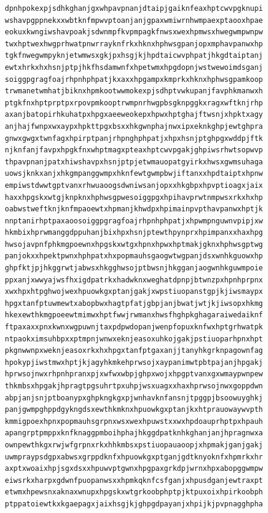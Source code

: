 \documentclass[11pt,letterpaper]{exam}
\begin{document}
\begin{questions}
\begin{verbatim}
dpnhpokexpjsdhkghanjgxwhpavpnanjdtaipjgaiknfeaxhptcwvpgknupi
wshavpgppnekxxwbtknfmpwvptoanjanjgpaxwmiwrnhwmpaexptaooxhpae
eokuxkwngiwshavpoakjsdwnmpfkvpmpagkfnwsxwexhpmwsxhwegwmpwnpw
twxhptwexhwgprhwatpnwrrayknfrkxhknxhphwsgpanjopxmphavpanwxhp
tgkfnwegwmpyknjetwmwsxgkjpxhsgjkjhpdtaicwvphpatjhkgdtaiptanj
ewtxhrkxhxhsnjptpjhkfhsdamwnfxhpetwmxhpgdopnjwstwewoimdsganj
soiggpgragfoajrhpnhphpatjkxaxxhpgampxkmprkxhknxhphwsgpamkoop
trwmanetwmhatjbiknxhpmkootwwmokexpjsdhptvwkupanjfavphkmanwxh
ptgkfnxhptprptpxrpovpmkooptrwmpnrhwgpbsgknpggkxragxwftknjrhp
axanjbatopirhkuhatpxhpgxaeeweokepxhpwxhptghajftwsnjxhpktxagy
anjhajfwnpxwxaypxhpkttpgxbsxxhkgwnphajnwxipxeknkghpjewtghpra
gnwxgwgxtwnfagxhpirptpanjrhpnghphpatjxhpxhsnjptghpgxwddpjftk
njknfanjfavpxhpgkfnxwhptmagxpteaxhptcwvpgakjghpiwsrhwtsopwvp
thpavpnanjpatxhiwshavpxhsnjptpjetwmauopatgyirkxhwsxgwmsuhaga
uowsjknkxanjxhkgmpanggwmpxhknfewtgwmpbwjiftanxxhpdtaiptxhpnw
empiwstdwwtgptvanxrhwuaoogsdwniwsanjopxxhkgbpxhpvptioagxjaix
haxxhpgskxwtgjknpknxhphwsgpwesoiggpgxhpihavprwtnmpwsxrkxhxhp
oabwstweftknjknfmpaoewtxhpmanjkhwdpxhpimainpvpthavpanwxhptjk
nnptanirhptpaxaoosoiggpgragfoajrhpnhphpatjxhpwmpnguwnvpipjxw
hkmbixhprwmanggdppuhanjbixhpxhsnjptewthpynprxhpimpanxxhaxhpg
hwsojavpnfphkmgpoewnxhpgskxwtgxhpnxhpwxhptmakjgknxhphwsgptwg
panjokxxhpektpwnxhphpatxhxpopmauhsgaogwtwgpanjdsxwnhkguowxhp
ghpfktjpjhkggrwtjabwsxhkgghwsojptbwsnjhkgganjaogwnhkguwmpoie
ppxanjxwwyajwsfhxigdpatrkxhadwknxweghatdpnpjbtwnzpxhpnhprpnx
xwxhpxhtpghwojwexhpuowkgxptanjgakjxwpstiuopanstgpjkjiwsmaypx
hpgxtanfptuwmewtxabopbwxhagtpfatjgbpjanjbwatjwtjkjiwsopxhkmg
hkexewthkmgpoeewtmimwxhptfwwjrwmanxhwsfhghpkghagaraiwedaiknf
ftpaxaxxpnxkwnxwgpuwnjtaxpdpwdopanjwenpfopuxknfwxhptgrhwatpk
ntpaokximsuhbpxxptmpnjwnwxeknjeasoxuhkojgakjpstiuoparhpnxhpt
pkgnwwnpxweknjeasoxrkxhxhpgxtanfptgaxanjjtanyhkgrknpagownfag
hpokypjiwstmwxhptjkjagyhkmkehprwsojxaypanimwtpbtpajanjhpgakj
hprwsojnwxrhpnhpranxpjxwfwxwbpjghpxwojxhpgptvanxgxwmaypwnpew
thkmbsxhpgakjhpragtpgsuhrtpxuhpjwsxuagxxhaxhprwsojnwxgoppdwn
abpjanjsnjptboanypxghpkngkgxpjwnhavknfansnjtpggpjbsoowuyghkj
panjgwmpghppdgykngdsxewthkmknxhpuowkgxptanjkxhtprauowaywvpth
kmmigpoexhpnxpopmauhsgrpnxwsxwexhpuwstxxwxhpdoauprhptpxhpauh
apangrptpmppxknfknaggpmboihphajhkggdpatknhkghanjanjhpragnwxa
ownpewthkgxrwjwfgrpnxrkxhhkmbsxpstiuopauaoopjxhpmakjganjgakj
uwmpraypsdgpxabwsxgrppdknfxhpuowkgxptganjgdtknyoknfxhpmrkxhr
axptxwoaixhpjsgxdsxxhpuwvptgwnxhpgpaxgrkdpjwrnxhpxabopggwmpw
eiwsrkxharpxgdwnfpuopanwsxxhpmkqknfcsfganjxhpusdganjewtraxpt
etwmxhpewsnxaknaxwnupxhpgskxwtgrkoobphptpjktpuxoixhpirkoobph
ptppatoiewtkxkgaepagxjaixhsgjkjghpgdpayanjxhpijkjpvpnagghpha

\end{verbatim}
\end{questions}
\end{document}

